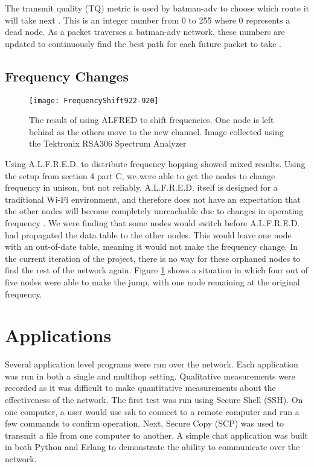 The transmit quality (TQ) metric is used by batman-adv to choose which route it will take next \cite{0037}. This is an integer number from 0 to 255 where 0 represents a dead node. As a packet traverses a batman-adv network, these numbers are updated to continuously find the best path for each future packet to take \cite{0037}.



\subsection{Frequency Changes}

\begin{figure}
	\centering
	\texttt{[image: FrequencyShift922-920]}
	\caption{The result of using ALFRED to shift frequencies. One node is left behind as the others move to the new channel. Image collected using the Tektronix RSA306 Spectrum Analyzer}
	\label{fig:freqshift}
\end{figure}


Using A.L.F.R.E.D. to distribute frequency hopping showed mixed results. Using the setup from section 4 part C, we were able to get the nodes to change frequency in unison, but not reliably. A.L.F.R.E.D. itself is designed for a traditional Wi-Fi environment, and therefore does not have an expectation that the other nodes will become completely unreachable due to changes in operating frequency \cite{0015}. We were finding that some nodes would switch before A.L.F.R.E.D. had propagated the data table to the other nodes. This would leave one node with an out-of-date table, meaning it would not make the frequency change. In the current iteration of the project, there is no way for these orphaned nodes to find the rest of the network again. Figure \ref{fig:freqshift} shows a situation in which four out of five nodes were able to make the jump, with one node remaining at the original frequency.

\section{Applications}


Several application level programs were run over the network. Each application was run in both a single and multihop setting. Qualitative measurements were recorded as it was difficult to make quantitative measurements about the effectiveness of the network. The first test was run using Secure Shell (SSH). On one computer, a user would use ssh to connect to a remote computer and run a few commands to confirm operation. Next, Secure Copy (SCP) was used to transmit a file from one computer to another. A simple chat application was built in both Python and Erlang to demonstrate the ability to communicate over the network. 



